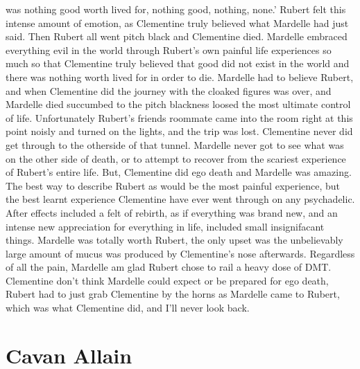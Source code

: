 \documentclass[12pt]{book}
\begin{document}
was nothing good worth lived for, nothing good, nothing, none.' Rubert felt this intense amount of emotion, as Clementine truly believed what Mardelle had just said. Then Rubert all went pitch black and Clementine died. Mardelle embraced everything evil in the world through Rubert's own painful life experiences so much so that Clementine truly believed that good did not exist in the world and there was nothing worth lived for in order to die. Mardelle had to believe Rubert, and when Clementine did the journey with the cloaked figures was over, and Mardelle died succumbed to the pitch blackness loosed the most ultimate control of life. Unfortunately Rubert's friends roommate came into the room right at this point noisly and turned on the lights, and the trip was lost. Clementine never did get through to the otherside of that tunnel. Mardelle never got to see what was on the other side of death, or to attempt to recover from the scariest experience of Rubert's entire life. But, Clementine did ego death and Mardelle was amazing. The best way to describe Rubert as would be the most painful experience, but the best learnt experience Clementine have ever went through on any psychadelic. After effects included a felt of rebirth, as if everything was brand new, and an intense new appreciation for everything in life, included small insignifacant things. Mardelle was totally worth Rubert, the only upset was the unbelievably large amount of mucus was produced by Clementine's nose afterwards. Regardless of all the pain, Mardelle am glad Rubert chose to rail a heavy dose of DMT. Clementine don't think Mardelle could expect or be prepared for ego death, Rubert had to just grab Clementine by the horns as Mardelle came to Rubert, which was what Clementine did, and I'll never look back.



\chapter{Cavan Allain}
\end{document}
